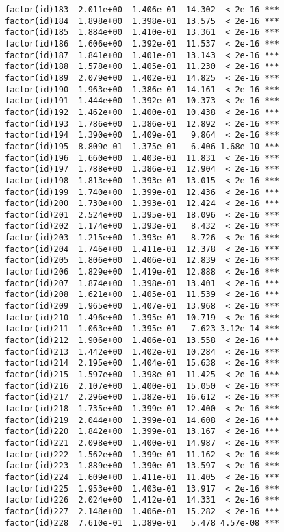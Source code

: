 \documentclass[]{article}
\begin{document}
\begin{verbatim}
factor(id)183  2.011e+00  1.406e-01  14.302  < 2e-16 ***
factor(id)184  1.898e+00  1.398e-01  13.575  < 2e-16 ***
factor(id)185  1.884e+00  1.410e-01  13.361  < 2e-16 ***
factor(id)186  1.606e+00  1.392e-01  11.537  < 2e-16 ***
factor(id)187  1.841e+00  1.401e-01  13.143  < 2e-16 ***
factor(id)188  1.578e+00  1.405e-01  11.230  < 2e-16 ***
factor(id)189  2.079e+00  1.402e-01  14.825  < 2e-16 ***
factor(id)190  1.963e+00  1.386e-01  14.161  < 2e-16 ***
factor(id)191  1.444e+00  1.392e-01  10.373  < 2e-16 ***
factor(id)192  1.462e+00  1.400e-01  10.438  < 2e-16 ***
factor(id)193  1.786e+00  1.386e-01  12.892  < 2e-16 ***
factor(id)194  1.390e+00  1.409e-01   9.864  < 2e-16 ***
factor(id)195  8.809e-01  1.375e-01   6.406 1.68e-10 ***
factor(id)196  1.660e+00  1.403e-01  11.831  < 2e-16 ***
factor(id)197  1.788e+00  1.386e-01  12.904  < 2e-16 ***
factor(id)198  1.813e+00  1.393e-01  13.015  < 2e-16 ***
factor(id)199  1.740e+00  1.399e-01  12.436  < 2e-16 ***
factor(id)200  1.730e+00  1.393e-01  12.424  < 2e-16 ***
factor(id)201  2.524e+00  1.395e-01  18.096  < 2e-16 ***
factor(id)202  1.174e+00  1.393e-01   8.432  < 2e-16 ***
factor(id)203  1.215e+00  1.393e-01   8.726  < 2e-16 ***
factor(id)204  1.746e+00  1.411e-01  12.378  < 2e-16 ***
factor(id)205  1.806e+00  1.406e-01  12.839  < 2e-16 ***
factor(id)206  1.829e+00  1.419e-01  12.888  < 2e-16 ***
factor(id)207  1.874e+00  1.398e-01  13.401  < 2e-16 ***
factor(id)208  1.621e+00  1.405e-01  11.539  < 2e-16 ***
factor(id)209  1.965e+00  1.407e-01  13.968  < 2e-16 ***
factor(id)210  1.496e+00  1.395e-01  10.719  < 2e-16 ***
factor(id)211  1.063e+00  1.395e-01   7.623 3.12e-14 ***
factor(id)212  1.906e+00  1.406e-01  13.558  < 2e-16 ***
factor(id)213  1.442e+00  1.402e-01  10.284  < 2e-16 ***
factor(id)214  2.195e+00  1.404e-01  15.638  < 2e-16 ***
factor(id)215  1.597e+00  1.398e-01  11.425  < 2e-16 ***
factor(id)216  2.107e+00  1.400e-01  15.050  < 2e-16 ***
factor(id)217  2.296e+00  1.382e-01  16.612  < 2e-16 ***
factor(id)218  1.735e+00  1.399e-01  12.400  < 2e-16 ***
factor(id)219  2.044e+00  1.399e-01  14.608  < 2e-16 ***
factor(id)220  1.842e+00  1.399e-01  13.167  < 2e-16 ***
factor(id)221  2.098e+00  1.400e-01  14.987  < 2e-16 ***
factor(id)222  1.562e+00  1.399e-01  11.162  < 2e-16 ***
factor(id)223  1.889e+00  1.390e-01  13.597  < 2e-16 ***
factor(id)224  1.609e+00  1.411e-01  11.405  < 2e-16 ***
factor(id)225  1.953e+00  1.403e-01  13.917  < 2e-16 ***
factor(id)226  2.024e+00  1.412e-01  14.331  < 2e-16 ***
factor(id)227  2.148e+00  1.406e-01  15.282  < 2e-16 ***
factor(id)228  7.610e-01  1.389e-01   5.478 4.57e-08 ***

\end{verbatim}
\end{document}
